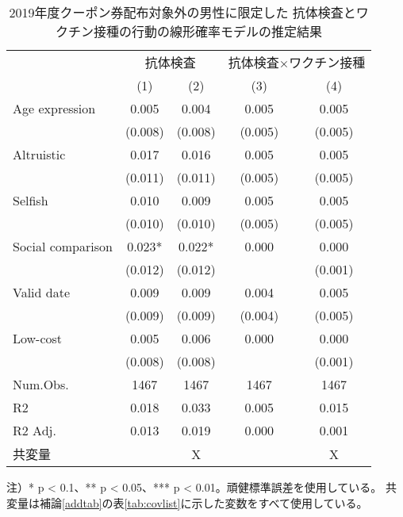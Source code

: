 \documentclass[
  11pt,
  a4paper,
]{article}
\begin{document}
\begin{table}

\caption{\label{tab:show-act-coupon0-reg}2019年度クーポン券配布対象外の男性に限定した 抗体検査とワクチン接種の行動の線形確率モデルの推定結果}
\centering
\begin{threeparttable}
\begin{tabular}[t]{lcccc}
\toprule
\multicolumn{1}{c}{ } & \multicolumn{2}{c}{抗体検査} & \multicolumn{2}{c}{抗体検査×ワクチン接種} \\
\cmidrule(l{3pt}r{3pt}){2-3} \cmidrule(l{3pt}r{3pt}){4-5}
  & (1) & (2) & (3) & (4)\\
\midrule
Age expression & 0.005 & 0.004 & 0.005 & 0.005\\
 & (0.008) & (0.008) & (0.005) & (0.005)\\
Altruistic & 0.017 & 0.016 & 0.005 & 0.005\\
 & (0.011) & (0.011) & (0.005) & (0.005)\\
Selfish & 0.010 & 0.009 & 0.005 & 0.005\\
 & (0.010) & (0.010) & (0.005) & (0.005)\\
Social comparison & 0.023* & 0.022* & 0.000 & 0.000\\
 & (0.012) & (0.012) &  & (0.001)\\
Valid date & 0.009 & 0.009 & 0.004 & 0.005\\
 & (0.009) & (0.009) & (0.004) & (0.005)\\
Low-cost & 0.005 & 0.006 & 0.000 & 0.000\\
 & (0.008) & (0.008) &  & (0.001)\\
\midrule
Num.Obs. & 1467 & 1467 & 1467 & 1467\\
R2 & 0.018 & 0.033 & 0.005 & 0.015\\
R2 Adj. & 0.013 & 0.019 & 0.000 & 0.001\\
共変量 &  & X &  & X\\
\bottomrule
\end{tabular}
\begin{tablenotes}
\item 注）* p < 0.1、** p < 0.05、*** p < 0.01。頑健標準誤差を使用している。 共変量は補論\ref{addtab}の表\ref{tab:covlist}に示した変数をすべて使用している。
\end{tablenotes}
\end{threeparttable}
\end{table}
\end{document}
